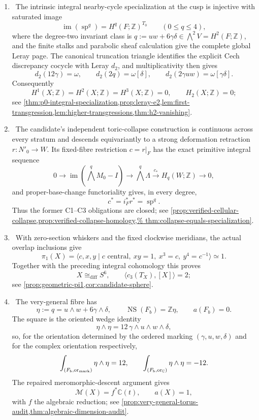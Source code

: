\begin{enumerate}[leftmargin=1.8em]
\item \Verified\ The intrinsic integral nearby-cycle specialization at the
cusp is injective with saturated image
\[
 \operatorname{im}(\operatorname{sp}^q)
   =H^q(F;\mathbb Z)^{T_0}\qquad(0\le q\le4),
\]
where the degree-two invariant class is
$q:=uw+6\gamma\delta\in\bigwedge^2V=H^2(F;\mathbb Z)$,
and the finite stalks and parabolic sheaf calculation give the complete
global Leray page.  The canonical truncation triangle identifies the
explicit Cech discrepancy cocycle with Leray \(d_2\), and multiplicativity
then gives
\[
 d_2(12\gamma)=\omega,\qquad
 d_2(2q)=\omega[\delta],\qquad
 d_2(2\gamma uw)=\omega[\gamma\delta].
\]
Consequently
\[
 H^1(X;\mathbb Z)=H^2(X;\mathbb Z)=H^3(X;\mathbb Z)=0,
 \qquad H_2(X;\mathbb Z)=0;
\]
see
\cref{thm:p0-integral-specialization,prop:leray-e2,lem:first-transgression,lem:higher-transgressions,thm:h2-vanishing}.

\item \Verified\ The candidate's independent toric-collapse construction is
continuous across every stratum and descends equivariantly to a strong
deformation retraction $r:N'_0\to W$.  Its fixed-fibre restriction
$c=r|_F$ has the exact primitive integral sequence
\[
0\longrightarrow\operatorname{im}(\textstyle\bigwedge^qM_0-I)
\longrightarrow\textstyle\bigwedge^q\Lambda
\xrightarrow{c_*}H_q(W;\mathbb Z)\longrightarrow0,
\]
and proper-base-change functoriality gives, in every degree,
\[
 c^*=i_F^*r^*=\operatorname{sp}^q.
\]
Thus the former C1--C3 obligations are closed; see
\cref{prop:verified-cellular-collapse,prop:verified-collapse-homology,%
thm:collapse-equals-specialization}.

\item \Verified\ With zero-section whiskers and the fixed clockwise
meridians, the actual overlap inclusions give
\[
 \pi_1(X)=
 \langle c,x,y\mid c\text{ central},\ xy=1,\ x^3=c,\ y^4=c^{-1}\rangle
 \simeq1.
\]
Together with the preceding integral cohomology this proves
\[
 X\cong_{\mathrm{diff}}S^6,\qquad
 \langle c_3(T_X),[X]\rangle=2;
\]
see \cref{prop:geometric-pi1,cor:candidate-sphere}.

\item \Verified\ The very-general fibre has
\[
 \eta:=q=u\wedge w+6\gamma\wedge\delta,\qquad
 \operatorname{NS}(F_b)=\mathbb Z\eta,\qquad a(F_b)=0.
\]
The square is the oriented wedge identity
\[
 \eta\wedge\eta
 =12\,\gamma\wedge u\wedge w\wedge\delta,
\]
so, for the orientation determined by the ordered marking
\((\gamma,u,w,\delta)\) and for the complex orientation respectively,
\[
 \int_{(F_b,\operatorname{or}_{\rm mark})}\eta\wedge\eta=12,
 \qquad
 \int_{(F_b,\operatorname{or}_{\mathbb C})}\eta\wedge\eta=-12.
\]
The repaired meromorphic-descent argument gives
\[
 \mathcal M(X)=f^*\mathbb C(t),\qquad a(X)=1,
\]
with \(f\) the algebraic reduction; see
\cref{prop:very-general-torus-audit,thm:algebraic-dimension-audit}.


\end{enumerate}
